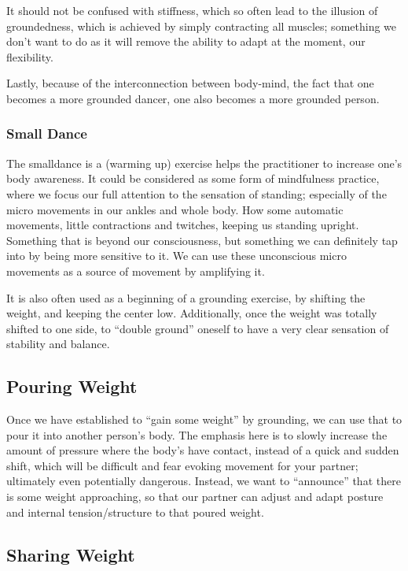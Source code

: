 It should not be confused with stiffness, which so often lead to the illusion of groundedness, which is achieved by simply contracting all muscles; something we don't want to do as it will remove the ability to adapt at the moment, our flexibility.

Lastly, because of the interconnection between body-mind, the fact that one becomes a more grounded dancer, one also becomes a more grounded person.

\subsubsection{Small Dance}

The \gls{smalldance} is a (warming up) exercise helps the practitioner to increase one's body awareness.
It could be considered as some form of mindfulness practice, where we focus our full attention to the sensation of standing; especially of the micro movements in our ankles and whole body.
How some automatic movements, little contractions and twitches, keeping us standing upright.
Something that is beyond our consciousness, but something we can definitely tap into by being more sensitive to it.
We can use these unconscious micro movements as a source of movement by amplifying it.

It is also often used as a beginning of a grounding exercise, by shifting the weight, and keeping the center low.
Additionally, once the weight was totally shifted to one side, to ``double ground'' oneself to have a very clear sensation of stability and balance.

\subsection{Pouring Weight}\label{subsec:pouring-weight}

Once we have established to ``gain some weight'' by grounding, we can use that to pour it into another person's body.
The emphasis here is to slowly increase the amount of pressure where the body's have contact, instead of a quick and sudden shift, which will be difficult and fear evoking movement for your partner; ultimately even potentially dangerous.
Instead, we want to ``announce'' that there is some weight approaching, so that our partner can adjust and adapt posture and internal tension/structure to that poured weight.

\subsection{Sharing Weight}\label{subsec:sharing-weight}

